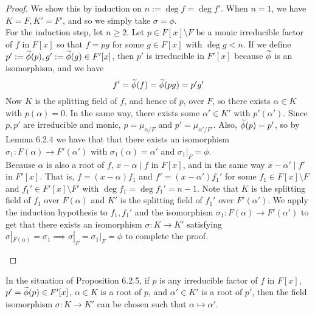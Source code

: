 \documentclass[11pt]{book}
\theoremstyle{definition}   \newtheorem{defn}[counter]{Definition} %
\newcommand{\bs}{\setminus}   \newcommand{\A}{\mathcal{A}}   \newcommand{\sy}{\textnormal{Syl}}   \newcommand{\size}[1]{\left| #1 \right|}
\DeclareMathOperator{\ra}{\rightarrow}   \DeclareMathOperator{\Poly}{\mathbf{P}}   \DeclareMathOperator{\spn}{\textnormal{span}}   \DeclareMathOperator{\aut}{\textnormal{Aut}}
\newcommand{\vs}{\vspace{8pt}}   \newcommand{\hs}{\hspace{8pt}}
\numberwithin{counter}{chapter}
\begin{document}
\begin{proof}
We show this by induction on $n := \deg f = \deg f'$. When $n = 1$, we have $K = F, K' = F'$, and so we simply take $\sigma = \phi$. \\

For the induction step, let $n \geq 2$. Let $p \in F[x] \bs F$ be a monic irreducible factor of $f$ in $F[x]$ so that $f = pg$ for some $g \in F[x]$ with $\deg g < n$. If we define $p' := \widetilde{\phi}(p), g' := \widetilde{\phi}(g) \in F'[x]$, then $p'$ is irreducible in $F'[x]$ because $\widetilde{\phi}$ is an isomorphism, and we have
	\[f' = \widetilde{\phi}(f) = \widetilde{\phi}(pg) = p' g' \]
Now $K$ is the splitting field of $f$, and hence of $p$, over $F$, so there exists $\alpha \in K$ with $p(\alpha) = 0$. In the same way, there exists some $\alpha' \in K'$ with $p'(\alpha')$. Since $p,p'$ are irreducible and monic, $p = \mu_{\alpha/F}$ and $p' = \mu_{\alpha'/F'}$. Also, $\widetilde{\phi}(p) = p'$, so by Lemma 6.2.4 we have that that there exists an isomorphism $\sigma_1 : F(\alpha) \ra F'(\alpha')$ with $\sigma_1(\alpha) = \alpha'$ and $\sigma_1|_F = \phi$. \\

Because $\alpha$ is also a root of $f$, $x-\alpha \mid f$ in $F[x]$, and in the same way $x-\alpha' \mid f'$ in $F'[x]$. That is, $f = (x-\alpha) f_1$ and $f' = (x-\alpha') f_1'$ for some $f_1 \in F[x] \bs F$ and $f_1' \in F'[x] \bs F'$ with $\deg f_1 = \deg f_1' = n-1$. Note that $K$ is the splitting field of $f_1$ over $F(\alpha)$ and $K'$ is the splitting field of $f_1'$ over $F'(\alpha')$. We apply the induction hypothesis to $f_1,f_1'$ and the isomorphism $\sigma_1 : F(\alpha) \ra F'(\alpha')$ to get that there exists an isomorphism $\sigma : K \ra K'$ satisfying $\sigma|_{F(\alpha)} = \sigma_1 \implies \sigma|_F = \sigma_1|_F = \phi$ to complete the proof. 
\begin{center}
\end{center}
\end{proof}

\vs

\begin{corollary}
In the situation of Proposition 6.2.5, if $p$ is any irreducible factor of $f$ in $F[x]$, $p' = \widetilde{\phi}(p) \in F'[x]$, $\alpha \in K$ is a root of $p$, and $\alpha' \in K'$ is a root of $p'$, then the field isomorphism $\sigma : K \ra K'$ can be chosen such that $\alpha \mapsto \alpha'$. 
\end{corollary}
\end{document}
